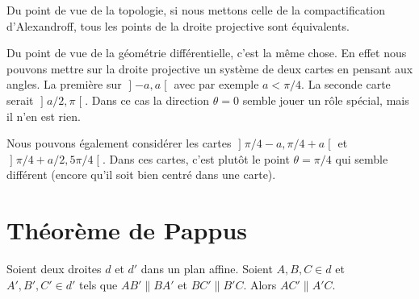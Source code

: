 \newcommand{\CaptionFigChoixInfini}{Deux façons de voir la droite projective. Étant donné que les points de la droite projective doivent être interprétés comme des directions (des classes d'équivallence), en réalité les deux dessins représentent les mêmes ensembles.}


\begin{remark}
    Du point de vue de la topologie, si nous mettons celle de la compactification d'Alexandroff, tous les points de la droite projective sont équivalents.

    Du point de vue de la géométrie différentielle, c'est la même chose. En effet nous pouvons mettre sur la droite projective un système de deux cartes en pensant aux angles. La première sur \( \mathopen] -a , a \mathclose[\) avec par exemple \( a<\pi/4\). La seconde carte serait \( \mathopen] a/2 , \pi \mathclose[\). Dans ce cas la direction \( \theta=0\) semble jouer un rôle spécial, mais il n'en est rien.

    Nous pouvons également considérer les cartes \( \mathopen] \pi/4-a , \pi/4+a \mathclose[\) et \( \mathopen] \pi/4+a/2 , 5\pi/4 \mathclose[\). Dans ces cartes, c'est plutôt le point \( \theta=\pi/4\) qui semble différent (encore qu'il soit bien centré dans une carte).
\end{remark}


\section{Théorème de Pappus}

\begin{theorem}     
    Soient deux droites \( d\) et \( d'\) dans un plan affine. Soient \( A,B,C\in d\) et \( A',B',C'\in d'\) tels que \( AB'\parallel BA'\) et \( BC'\parallel B'C\). Alors \( AC'\parallel A'C\).
\end{theorem}

